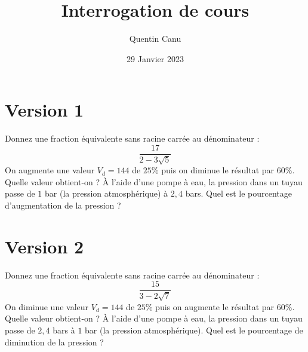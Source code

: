 \documentclass{exam}
\title{Interrogation de cours}
\date{29 Janvier 2023}
\author{Quentin Canu}
\begin{document}
\section*{Version 1}
\begin{questions}
\question Donnez une fraction équivalente sans racine carrée au dénominateur :
\begin{equation*}
\dfrac{17}{2 - 3\sqrt{5}}
\end{equation*}
\question On augmente une valeur $V_d = 144$ de $25\%$ puis on diminue le résultat par $60\%$. Quelle valeur obtient-on ?
\question À l'aide d'une pompe à eau, la pression dans un tuyau passe de $1$ bar (la pression atmosphérique) à $2,4$ bars. Quel est le pourcentage d'augmentation de la pression ?
\end{questions}
\newpage
\section*{Version 2}
\begin{questions}
\question Donnez une fraction équivalente sans racine carrée au dénominateur :
\begin{equation*}
\dfrac{15}{3 - 2\sqrt{7}}
\end{equation*}
\question On diminue une valeur $V_d = 144$ de $25\%$ puis on augmente le résultat par $60\%$. Quelle valeur obtient-on ?
\question À l'aide d'une pompe à eau, la pression dans un tuyau passe de $2,4$ bars à $1$ bar (la pression atmosphérique). Quel est le pourcentage de diminution de la pression ?
\end{questions}
\end{document}
